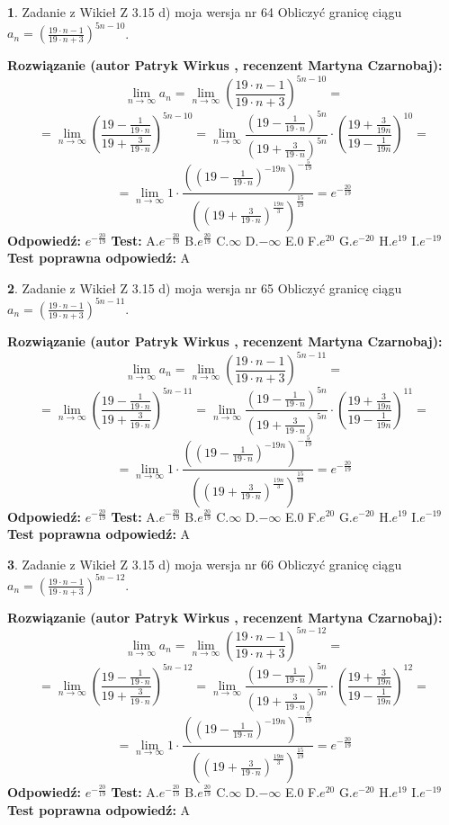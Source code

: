 \documentclass[12pt, a4paper]{article}
\theoremstyle{definition} %
\newtheorem{zad}{}
\newcommand{\zadStart}[1]{\begin{zad}#1\newline}
\newcommand{\zadStop}{\end{zad}}
\newcommand{\rozwStart}[2]{\noindent \textbf{Rozwiązanie (autor #1 , recenzent #2): }\newline}
\newcommand{\rozwStop}{\newline}
\newcommand{\odpStart}{\noindent \textbf{Odpowiedź:}\newline}
\newcommand{\odpStop}{\newline}
\newcommand{\testStart}{\noindent \textbf{Test:}\newline}
\newcommand{\testStop}{\newline}
\newcommand{\kluczStart}{\noindent \textbf{Test poprawna odpowiedź:}\newline}
\newcommand{\kluczStop}{\newline}
\begin{document}
\zadStart{Zadanie z Wikieł Z 3.15 d) moja wersja nr 64}
Obliczyć granicę ciągu $a_{n}=(\frac{19\cdot n - 1}{19 \cdot n + 3})^{5n-10}$.
\zadStop
\rozwStart{Patryk Wirkus}{Martyna Czarnobaj}
$$\lim\limits_{n\to\infty} a_{n} = \lim\limits_{n\to\infty}(\frac{19\cdot n - 1}{19 \cdot n + 3})^{5n-10}=$$
$$=\lim\limits_{n\to\infty}(\frac{19 - \frac{1}{19\cdot n}}{19 + \frac{3}{19 \cdot n}})^{5n-10}=\lim\limits_{n\to\infty}\frac{(19 - \frac{1}{19\cdot n})^{5n}}{(19 + \frac{3}{19\cdot n})^{5n}} \cdot (\frac{19+\frac{3}{19n}}{19-\frac{1}{19n}})^{10}=$$
$$=\lim\limits_{n\to\infty} 1 \cdot \frac{((19-\frac{1}{19 \cdot n})^{-19n})^{-\frac{5}{19}}}{((19+\frac{3}{19 \cdot n})^{\frac{19n}{3}})^{\frac{15}{19}}} =e^{-\frac{20}{19}}$$
\rozwStop
\odpStart
$e^{-\frac{20}{19}}$
\odpStop
\testStart
A.$ e^{-\frac{20}{19}}$
B.$ e^{\frac{20}{19}}$
C.$\infty$
D.$-\infty$
E.$0$
F.$e^{20}$
G.$e^{-20}$
H.$e^{19}$
I.$e^{-19}$
\testStop
\kluczStart
A
\kluczStop



\zadStart{Zadanie z Wikieł Z 3.15 d) moja wersja nr 65}
Obliczyć granicę ciągu $a_{n}=(\frac{19\cdot n - 1}{19 \cdot n + 3})^{5n-11}$.
\zadStop
\rozwStart{Patryk Wirkus}{Martyna Czarnobaj}
$$\lim\limits_{n\to\infty} a_{n} = \lim\limits_{n\to\infty}(\frac{19\cdot n - 1}{19 \cdot n + 3})^{5n-11}=$$
$$=\lim\limits_{n\to\infty}(\frac{19 - \frac{1}{19\cdot n}}{19 + \frac{3}{19 \cdot n}})^{5n-11}=\lim\limits_{n\to\infty}\frac{(19 - \frac{1}{19\cdot n})^{5n}}{(19 + \frac{3}{19\cdot n})^{5n}} \cdot (\frac{19+\frac{3}{19n}}{19-\frac{1}{19n}})^{11}=$$
$$=\lim\limits_{n\to\infty} 1 \cdot \frac{((19-\frac{1}{19 \cdot n})^{-19n})^{-\frac{5}{19}}}{((19+\frac{3}{19 \cdot n})^{\frac{19n}{3}})^{\frac{15}{19}}} =e^{-\frac{20}{19}}$$
\rozwStop
\odpStart
$e^{-\frac{20}{19}}$
\odpStop
\testStart
A.$ e^{-\frac{20}{19}}$
B.$ e^{\frac{20}{19}}$
C.$\infty$
D.$-\infty$
E.$0$
F.$e^{20}$
G.$e^{-20}$
H.$e^{19}$
I.$e^{-19}$
\testStop
\kluczStart
A
\kluczStop



\zadStart{Zadanie z Wikieł Z 3.15 d) moja wersja nr 66}
Obliczyć granicę ciągu $a_{n}=(\frac{19\cdot n - 1}{19 \cdot n + 3})^{5n-12}$.
\zadStop
\rozwStart{Patryk Wirkus}{Martyna Czarnobaj}
$$\lim\limits_{n\to\infty} a_{n} = \lim\limits_{n\to\infty}(\frac{19\cdot n - 1}{19 \cdot n + 3})^{5n-12}=$$
$$=\lim\limits_{n\to\infty}(\frac{19 - \frac{1}{19\cdot n}}{19 + \frac{3}{19 \cdot n}})^{5n-12}=\lim\limits_{n\to\infty}\frac{(19 - \frac{1}{19\cdot n})^{5n}}{(19 + \frac{3}{19\cdot n})^{5n}} \cdot (\frac{19+\frac{3}{19n}}{19-\frac{1}{19n}})^{12}=$$
$$=\lim\limits_{n\to\infty} 1 \cdot \frac{((19-\frac{1}{19 \cdot n})^{-19n})^{-\frac{5}{19}}}{((19+\frac{3}{19 \cdot n})^{\frac{19n}{3}})^{\frac{15}{19}}} =e^{-\frac{20}{19}}$$
\rozwStop
\odpStart
$e^{-\frac{20}{19}}$
\odpStop
\testStart
A.$ e^{-\frac{20}{19}}$
B.$ e^{\frac{20}{19}}$
C.$\infty$
D.$-\infty$
E.$0$
F.$e^{20}$
G.$e^{-20}$
H.$e^{19}$
I.$e^{-19}$
\testStop
\kluczStart
A
\kluczStop
\end{document}
